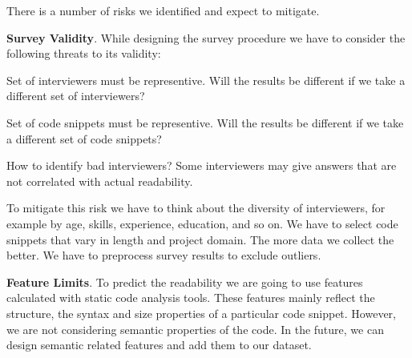 There is a number of risks we identified and expect to mitigate.

\textbf{Survey Validity}.
While designing the survey procedure we have to 
consider the following threats to its validity:
\begin{enumerate*}[label=\arabic*)]
    \item Set of interviewers must be representive. 
    Will the results be different if we take a different set of interviewers?
    \item Set of code snippets must be representive. 
    Will the results be different if we take a different set of code snippets? 
    \item How to identify bad interviewers? 
    Some interviewers may give answers that are not correlated with actual readability.
\end{enumerate*}
To mitigate this risk we have to think about the diversity of interviewers, 
for example by age, skills, experience, education, and so on. We have to select code snippets
that vary in length and project domain. The more data we collect the better. 
We have to preprocess survey results to exclude outliers.

\textbf{Feature Limits}.
To predict the readability we are going to use features 
calculated with static code analysis tools. 
These features mainly reflect the structure, the syntax and 
size properties of a particular code snippet.  
However, we are not considering semantic properties of the code. 
In the future, we can design semantic related features and 
add them to our dataset.